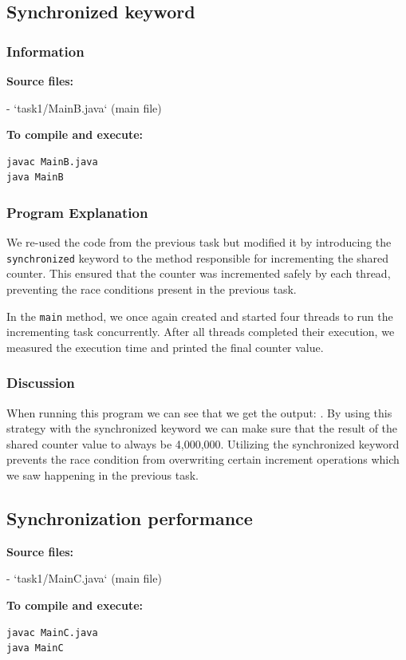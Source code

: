 \documentclass{article}
\begin{document}
\subsection{Synchronized keyword}
\subsubsection{Information}
\textbf{Source files:}

- `task1/MainB.java` (main file)

\textbf{To compile and execute:}
\begin{lstlisting}[style=bash]
javac MainB.java
java MainB
\end{lstlisting}


\subsubsection{Program Explanation}
We re-used the code from the previous task but modified it by introducing the \texttt{synchronized} keyword to the method responsible for incrementing the shared counter. This ensured that the counter was incremented safely by each thread, preventing the race conditions present in the previous task.

In the \texttt{main} method, we once again created and started four threads to run the incrementing task concurrently. After all threads completed their execution, we measured the execution time and printed the final counter value.

\subsubsection{Discussion}
When running this program we can see that we get the output: . By using this strategy with the synchronized keyword we can make sure that the result of the shared counter value to always be 4,000,000. Utilizing the synchronized keyword prevents the race condition from overwriting certain increment operations which we saw happening in the previous task.



\subsection{Synchronization performance}
\textbf{Source files:}

- `task1/MainC.java` (main file)

\textbf{To compile and execute:}
\begin{lstlisting}[style=bash]
javac MainC.java
java MainC
\end{lstlisting}
\end{document}

